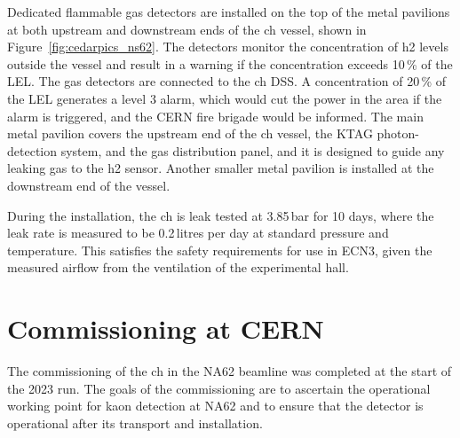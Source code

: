 \documentclass[../../main.tex]{subfiles}
\begin{document}
    Dedicated flammable gas detectors are installed on the top of the metal pavilions at both upstream and downstream ends of the \gls{ch} vessel, shown in Figure~\ref{fig:cedarpics_ns62}. The detectors monitor the concentration of \gls{h2} levels outside the vessel 
    and result in a warning if the concentration exceeds 10\,\% of the LEL. The gas detectors are connected to the \gls{ch} \gls{DSS}. A concentration of 20\,\% of the LEL generates a level 3 alarm, which would cut the power in the area if the alarm is triggered, and the CERN fire brigade would be informed.
    The main metal pavilion covers the upstream end of the \gls{ch} vessel, the KTAG photon-detection system, and the gas distribution panel, and it is designed to guide any leaking gas to the \gls{h2} sensor. Another smaller metal pavilion is installed at the downstream end of the vessel.

    During the installation, the \gls{ch} is leak tested at 3.85\,bar for 10 days, where the leak rate is measured to be 0.2\,litres per day at standard pressure and temperature. This satisfies the safety requirements for use in ECN3, given the measured airflow from the ventilation of the experimental hall.

    \section{Commissioning at CERN}
    The commissioning of the \gls{ch} in the NA62 beamline was completed at the start of the 2023 run. The goals of the commissioning are to ascertain the operational working point for kaon detection at NA62 and to ensure that the detector is operational after its transport and installation. 
\end{document}
